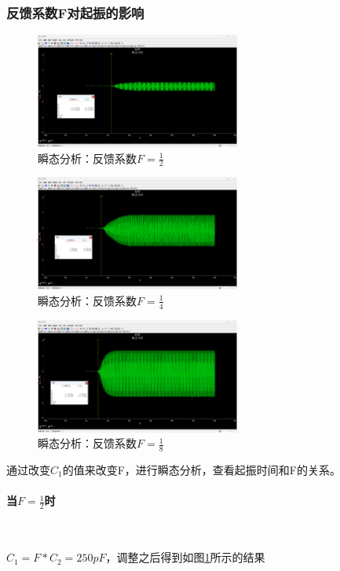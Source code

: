 \documentclass[UTF8]{ctexart}
\begin{document}
\subsubsection{反馈系数F对起振的影响}
\begin{figure}[htbp]
    \centering
    \includegraphics[width=0.6\textwidth]{6.png}
    \caption{瞬态分析：反馈系数$F=\frac{1}{2}$}
    \label{img:6}
\end{figure}
\begin{figure}[htbp]
    \centering
    \includegraphics[width=0.6\textwidth]{7.png}
    \caption{瞬态分析：反馈系数$F=\frac{1}{4}$}
    \label{img:7}
\end{figure}
\begin{figure}[htbp]
    \centering
    \includegraphics[width=0.6\textwidth]{8.png}
    \caption{瞬态分析：反馈系数$F=\frac{1}{8}$}
    \label{img:8}
\end{figure}
通过改变$C_1$的值来改变F，进行瞬态分析，查看起振时间和F的关系。
\paragraph{当$F=\frac{1}{2}$时}~{}\par
$C_1=F*C_2=250pF$，调整之后得到如图\ref{img:6}所示的结果
\end{document}
